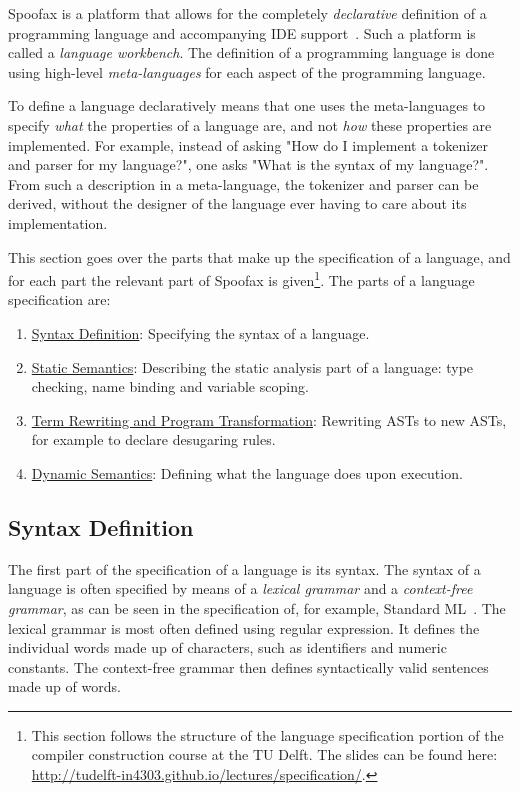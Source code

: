 Spoofax is a platform that allows for the completely \emph{declarative}
definition of a programming language and accompanying IDE
support~\cite{Kats10a}. Such a platform is called a \emph{language
workbench}. The definition of a programming language is done using
high-level \emph{meta-languages} for each aspect of the programming
language.

To define a language declaratively means that one uses the
meta-languages to specify \emph{what} the properties of a language are, and
not \emph{how} these properties are implemented. For example, instead of
asking "How do I implement a tokenizer and parser for my language?",
one asks "What is the syntax of my language?". From such a description
in a meta-language, the tokenizer and parser can be derived, without
the designer of the language ever having to care about its
implementation.

This section goes over the parts that make up the specification of a
language, and for each part the relevant part of Spoofax is
given\footnote{This section follows the structure of the
language specification portion of the compiler construction course at
the TU Delft. The slides can be found here:
\url{http://tudelft-in4303.github.io/lectures/specification/}.}. The parts
of a language specification are:
\begin{enumerate}
\item \hyperref[sec-syntax-def]{Syntax Definition}: Specifying the syntax of a language.
\item \hyperref[sec-static-analysis]{Static Semantics}: Describing the static analysis part of a
language: type checking, name binding and variable scoping.
\item \hyperref[sec-term-rewrite]{Term Rewriting and Program Transformation}: Rewriting ASTs to new
ASTs, for example to declare desugaring rules.
\item \hyperref[sec-dynamic-semantics]{Dynamic Semantics}: Defining what the language does upon execution.
\end{enumerate}

\subsection{Syntax Definition}
\label{sec-syntax-def}
The first part of the specification of a language is its syntax. The
syntax of a language is often specified by means of a \emph{lexical
grammar} and a \emph{context-free grammar}, as can be seen in the
specification of, for example, Standard ML~\cite{Milner97}. The
lexical grammar is most often defined using regular expression. It
defines the individual words made up of characters, such as
identifiers and numeric constants. The context-free grammar then
defines syntactically valid sentences made up of words.


